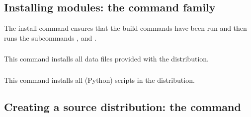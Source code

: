 \documentclass{howto}
\begin{document}




\subsection{Installing modules: the \protect{} command family}
\label{install-cmd}

The install command ensures that the build commands have been run and then
runs the subcommands ,
 and
.


\subsubsection{\protect{}}
\label{install-data-cmd}
This command installs all data files provided with the distribution.

\subsubsection{\protect{}}
\label{install-scripts-cmd}
This command installs all (Python) scripts in the distribution.




\subsection{Creating a source distribution: the
            \protect{} command}
\label{sdist-cmd}
\end{document}
